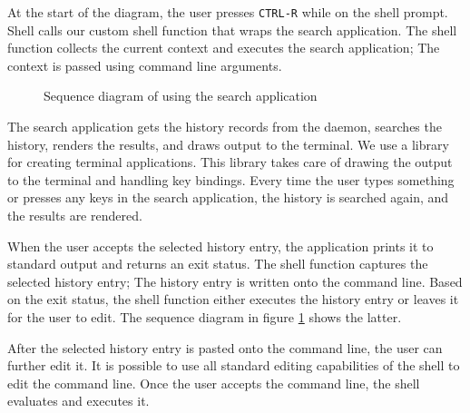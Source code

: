 At the start of the diagram, the user presses \verb|CTRL-R| while on the shell prompt. Shell calls our custom shell function that wraps the search application. The shell function collects the current context and executes the search application; The context is passed using command line arguments. 


\begin{figure}
\centering
{}
\caption{Sequence diagram of using the search application}
\label{impl-search-app-sequence}
\end{figure}


The search application gets the history records from the daemon, searches the history, renders the results, and draws output to the terminal. We use a library\cite{lib-gocui} for creating terminal applications. This library takes care of drawing the output to the terminal and handling key bindings. Every time the user types something or presses any keys in the search application, the history is searched again, and the results are rendered. 

When the user accepts the selected history entry, the application prints it to standard output and returns an exit status. 
The shell function captures the selected history entry; The history entry is written onto the command line. Based on the exit status, the shell function either executes the history entry or leaves it for the user to edit. The sequence diagram in figure \ref{impl-search-app-sequence} shows the latter. 

After the selected history entry is pasted onto the command line, the user can further edit it. 
It is possible to use all standard editing capabilities of the shell to edit the command line.
Once the user accepts the command line, the shell evaluates and executes it.




